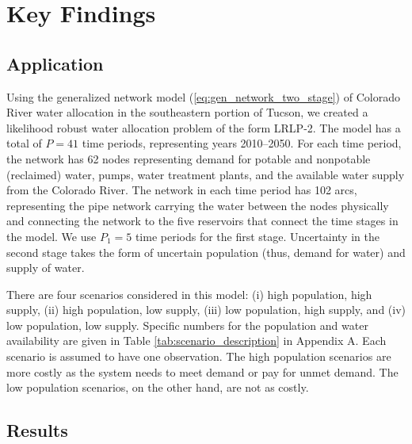 \documentclass[12pt]{amsart}
\begin{document}
\section{Key Findings}
\label{sec:results}

\subsection{Application} 
\label{sec:app}

Using the generalized network model (\ref{eq:gen_network_two_stage}) of Colorado River water allocation in the southeastern portion of Tucson, we created a likelihood robust water allocation problem of the form LRLP-2.
The model has a total of $P = 41$ time periods, representing years 2010--2050.
For each time period, the network has 62 nodes representing demand for potable and nonpotable (reclaimed) water, pumps, water treatment plants, and the available water supply from the Colorado River.
The network in each time period has 102 arcs, representing the pipe network carrying the water between the nodes physically and connecting the network to the five reservoirs that connect the time stages in the model.
We use $P_1 = 5$ time periods for the first stage.
Uncertainty in the second stage takes the form of uncertain population (thus, demand for water) and supply of water.

There are four scenarios considered in this model: (i) high population, high supply, (ii) high population, low supply, (iii) low population, high supply, and (iv) low population, low supply.
Specific numbers for the population and water availability are given in Table \ref{tab:scenario_description} in Appendix A.
Each scenario is assumed to have one observation.
The high population scenarios are more costly as the system needs to meet demand or pay for unmet demand.
The low population scenarios, on the other hand, are not as costly.

\subsection{Results} 
\label{sec:comp_results}
\end{document}
